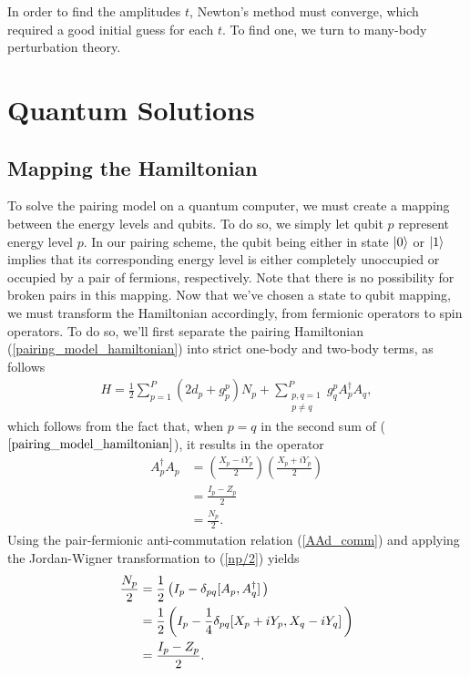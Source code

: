 \documentclass[10pt]{article}
\begin{document}
In order to find the amplitudes $t$, Newton's method must converge, which required a good initial guess for each $t$. To find one, we turn to many-body perturbation theory.

\section{Quantum Solutions}

\subsection{Mapping the Hamiltonian}

To solve the pairing model on a quantum computer, we must create a mapping between the energy levels and qubits. To do so, we simply let qubit $p$ represent energy level $p$. In our pairing scheme, the qubit being either in state $\ket{0}$ or $\ket{1}$ implies that its corresponding energy level is either completely unoccupied or occupied by a pair of fermions, respectively. Note that there is no possibility for broken pairs in this mapping. Now that we've chosen a state to qubit mapping, we must transform the Hamiltonian accordingly, from fermionic operators to spin operators. To do so, we'll first separate the pairing Hamiltonian (\ref{pairing_model_hamiltonian})
into strict one-body and two-body terms, as follows
\begin{align}
\label{pairing_model_hamiltonian_strict}
H
=
\frac{1}{2}\sum_{p=1}^P(2d_p+g^p_p)N_p
+\sum_{\substack{p,q=1 \\ p\neq q}}^Pg^p_qA^\dagger_pA_q
,\end{align}
which follows from the fact that, when $p=q$ in the second sum of ($\ref{pairing_model_hamiltonian}$), it results in the operator
\begin{align}
A^\dagger_pA_p
&=
\left(\frac{X_p-iY_p}{2}\right)\left(\frac{X_p+iY_p}{2}\right)
\\
&=
\frac{I_p-Z_p}{2}
\\
\label{np/2}
&=
\frac{N_p}{2}.
\end{align}
Using the pair-fermionic anti-commutation relation (\ref{AAd_comm}) and applying the Jordan-Wigner transformation to (\ref{np/2}) yields
\begin{align}
\frac{N_p}{2}
&=
\frac{1}{2}
\left(I_p-\delta_{pq}\comm*{A_p}{A^\dagger_q}\right)
\\
&=
\frac{1}{2}
\left(I_p-\frac{1}{4}\delta_{pq}\comm*{X_p+iY_p}{X_q-iY_q}\right)
\\
&=
\frac{I_p-Z_p}{2}.
\end{align}
\end{document}
